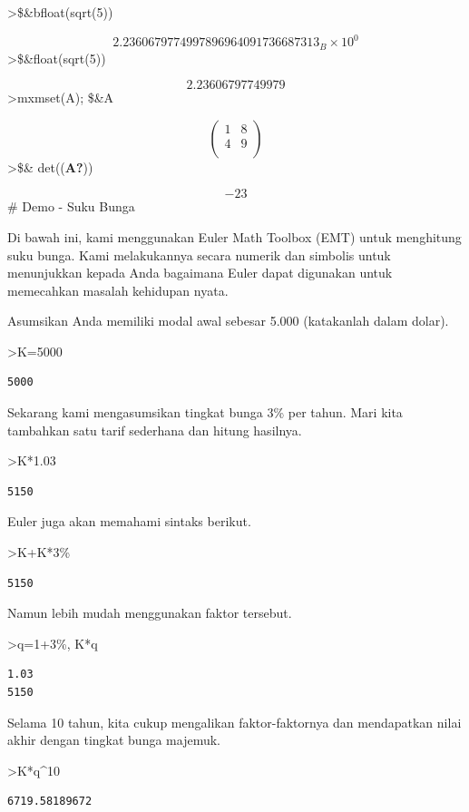 \documentclass[
]{book}
\begin{document}
\textgreater\$\&bfloat(sqrt(5))

\[2.2360679774997896964091736687313_B \times 10^{0}\]\textgreater\$\&float(sqrt(5))

\[2.23606797749979\]\textgreater mxmset(A); \$\&A

\[\begin{pmatrix}1 & 8 \\ 4 & 9 \\ \end{pmatrix}\]\textgreater\$\& det((\textbf{A?}))

\[-23\]\# Demo - Suku Bunga

Di bawah ini, kami menggunakan Euler Math Toolbox (EMT) untuk menghitung suku bunga. Kami melakukannya secara numerik dan simbolis untuk menunjukkan kepada Anda bagaimana Euler dapat digunakan untuk memecahkan masalah kehidupan nyata.

Asumsikan Anda memiliki modal awal sebesar 5.000 (katakanlah dalam dolar).

\textgreater K=5000

\begin{verbatim}
5000
\end{verbatim}

Sekarang kami mengasumsikan tingkat bunga 3\% per tahun. Mari kita tambahkan satu tarif sederhana dan hitung hasilnya.

\textgreater K*1.03

\begin{verbatim}
5150
\end{verbatim}

Euler juga akan memahami sintaks berikut.

\textgreater K+K*3\%

\begin{verbatim}
5150
\end{verbatim}

Namun lebih mudah menggunakan faktor tersebut.

\textgreater q=1+3\%, K*q

\begin{verbatim}
1.03
5150
\end{verbatim}

Selama 10 tahun, kita cukup mengalikan faktor-faktornya dan mendapatkan nilai akhir dengan tingkat bunga majemuk.

\textgreater K*q\^{}10

\begin{verbatim}
6719.58189672
\end{verbatim}
\end{document}
